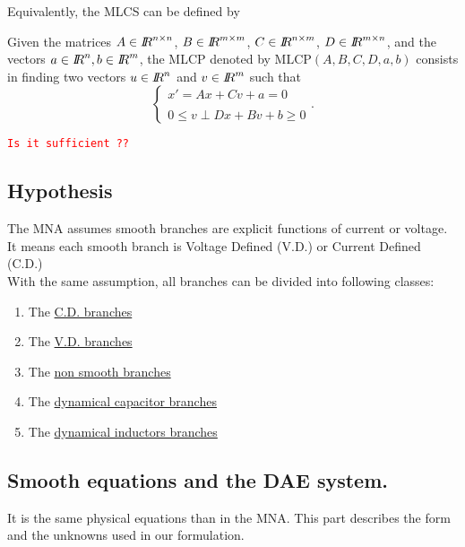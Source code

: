 Equivalently, the MLCS can be defined by 

\begin{definition} 
  Given the matrices  ${A} \in \mbox{\rm $I\!\!R$}^{n \times n}$, ${B} \in \mbox{\rm $I\!\!R$}^{m \times m}$, ${C} \in \mbox{\rm $I\!\!R$}^{n \times m}$, ${D} \in \mbox{\rm $I\!\!R$}^{m \times n}$, and the vectors  $ {a} \in \mbox{\rm $I\!\!R$}^n, {b} \in \mbox{\rm $I\!\!R$}^m$, the MLCP denoted by $\mathrm{MLCP}(A,B,C,D,a,b)$ consists in finding two vectors $ {u} \in \mbox{\rm $I\!\!R$}^n$ and  $ {v} \in \mbox{\rm $I\!\!R$}^m$ such that
\begin{equation}\label{eq:mlcp1} 
  \begin{cases}
   x' = A x + C v + a =0 \\  \\
   {0} \le {v} \perp     Dx +B v +b   \ge {0}
  \end{cases}.
\end{equation}
\end{definition}

\textcolor{red}{\tt Is it sufficient ??}
\subsection{Hypothesis}
The MNA assumes smooth branches are explicit functions of current or voltage. It means each smooth
branch is Voltage Defined (V.D.) or Current Defined (C.D.)\\

With the same assumption, all branches can be divided into following classes:\\
\begin{enumerate}
\item The  \underline{C.D. branches} 
\item The  \underline{V.D. branches}
 \item The  \underline{non smooth branches}
 \item The \underline{dynamical capacitor branches}
 \item The \underline{dynamical inductors branches}
\end{enumerate}



\subsection{Smooth equations and the DAE system.}
It is the same physical equations than in the MNA. This part describes the form and the unknowns
used in our formulation.

